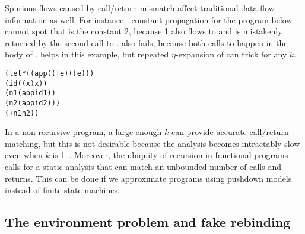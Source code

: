 \documentclass{LMCS}
\theoremstyle{definition} \newtheorem{property}[thm]{Property}
\begin{document}
Spurious flows caused by call/return mismatch affect traditional data-flow
information as well.
For instance, -constant-propagation for the program below
cannot spot that  is the constant 2,
because 1 also flows to  and is mistakenly returned by the second call to
.
 also fails, because both calls to  happen in the body of 
.
 helps in this example, but repeated $\eta$-expansion of  can 
trick \kcfa{} for any $k$.
\begin{center}
  \begin{minipage}{0.45\columnwidth}
    \begin{alltt}
(let* ((app (\lam(f e) (f e)))
       (id (\lam(x) x))
       (n1 (app id 1))
       (n2 (app id 2)))
  (+ n1 n2)) \end{alltt}    
  \end{minipage}
\end{center}

In a non-recursive program, a large enough $k$ can provide accurate 
call/return matching, but this is not desirable because the analysis becomes
intractably slow even when $k$ is 1~\cite{conf/icfp/08/vanhorn/kcfa}.
Moreover, the ubiquity of recursion in functional programs calls for a static
analysis that can match an unbounded number of calls and returns.
This can be done if we approximate programs using pushdown models instead of
finite-state machines.


\subsection{The environment problem and fake rebinding\label{sec:fake-rebind}}
\end{document}
